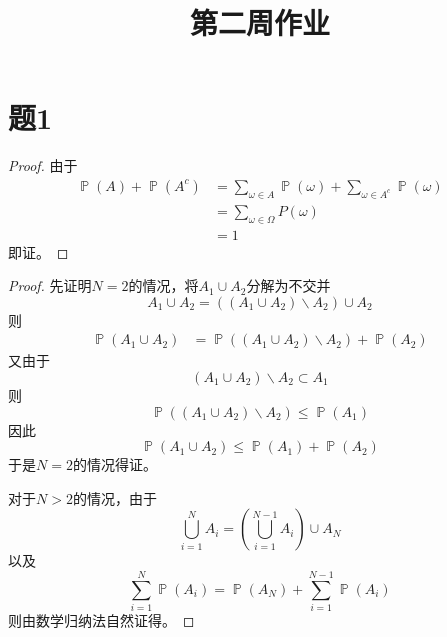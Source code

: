 \documentclass[cn]{homework}
\title{第二周作业}
\DeclareMathOperator{\prob}{\mathbb P}
\begin{document}
    \maketitle

    \section{题1}
    \begin{subproblem}
        \item
        \begin{proof}
            由于
            \begin{align*}
                \prob(A)+\prob(A^c)&=
                \sum_{\omega\in A}\prob(\omega)+\sum_{\omega\in A^c}\prob(\omega)\\
                &=\sum_{\omega\in\Omega}P(\omega)\\
                &=1
            \end{align*}
            即证。
        \end{proof}

        \item
        \begin{proof}
            先证明$N=2$的情况，将$A_1\cup A_2$分解为不交并
            \[A_1\cup A_2=((A_1\cup A_2)\backslash A_2)\cup A_2\]
            则
            \begin{align*}
                \prob(A_1\cup A_2)&=\prob((A_1\cup A_2)\backslash A_2)
                +\prob(A_2)
            \end{align*}
            又由于
            \[(A_1\cup A_2)\backslash A_2\subset A_1\]
            则
            \[\prob((A_1\cup A_2)\backslash A_2)\leq\prob(A_1)\]
            因此
            \[\prob(A_1\cup A_2)\leq\prob(A_1)+\prob(A_2)\]
            于是$N=2$的情况得证。

            对于$N>2$的情况，由于
            \[\bigcup_{i=1}^NA_i=\left(\bigcup_{i=1}^{N-1}A_i\right)\cup A_N\]
            以及
            \[\sum_{i=1}^N\prob(A_i)=\prob(A_N)+\sum_{i=1}^{N-1}\prob(A_i)\]
            则由数学归纳法自然证得。
        \end{proof}
    \end{subproblem}
\end{document}
